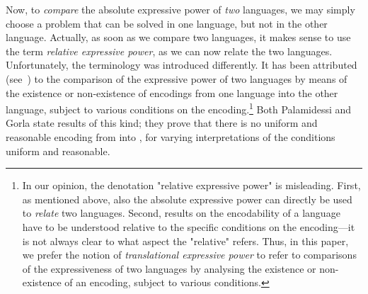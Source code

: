 \documentclass[11pt,techReport]{eptcs}
\begin{document}
Now, to \emph{compare} the absolute expressive power of \emph{two} languages, we may simply choose a problem that can be solved in one language, but not in the other language.  
Actually, as soon as we compare two languages, it makes sense to use the term \emph{relative expressive power}, as we can now relate the two languages.  Unfortunately, the terminology was introduced differently.
It has been attributed (see~\cite{parrow08}) to the comparison of the expressive power of two languages by means of the existence or non-existence of encodings from one language into the other language, subject to various conditions on the encoding.\footnote{In our opinion, the denotation "relative expressive power" is misleading.  First, as mentioned above, also the absolute expressive power can directly be used to \emph{relate} two languages.  Second, results on the encodability of a language have to be understood relative to the specific conditions on the encoding---it is not always clear to what aspect the "relative" refers. Thus, in this paper, we prefer the notion of \emph{translational expressive power} to refer to comparisons of the expressiveness of two languages by analysing the existence or non-existence of an encoding, subject to various conditions.}
Both Palamidessi and Gorla state results of this kind; they prove that there is no uniform and reasonable encoding from \pimix into \pisep, for varying interpretations of the conditions uniform and reasonable.  
\end{document}
